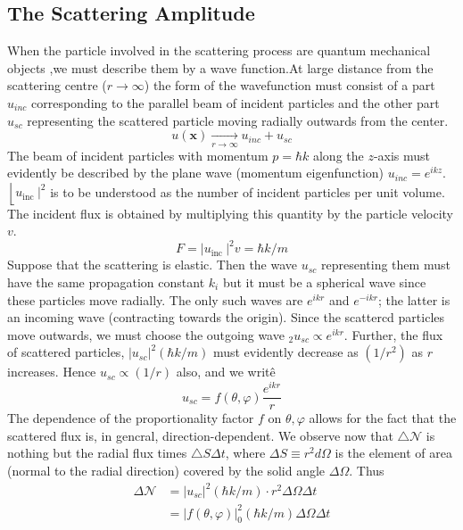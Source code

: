 \subsection{The Scattering Amplitude}
When the particle involved in the scattering process are quantum mechanical objects ,we must describe them by a wave function.At large distance from the scattering centre ($r\rightarrow \infty$) the form of the wavefunction must consist of a part $u_{inc}$ corresponding to the parallel beam of incident particles and the other part $u_{sc}$ representing the scattered particle moving radially outwards from the center.\\
$$u(\mathbf{x}) \underset{r \rightarrow \infty}{\longrightarrow} u_{i n c}+u_{s c}$$
The beam of incident particles with momentum $p=\hbar k$ along the $z$-axis must evidently be described by the plane wave (momentum eigenfunction) $u_{i n c}=e^{i k z}$.\\
 $\left\lfloor\left. u_{\text {inc }}\right|^{2}\right.$ is to be understood as the number of incident particles per unit volume. The incident flux is obtained by multiplying this quantity by the particle velocity $v$.
$$
F=\left|u_{\text {inc }}\right|^{2} v=\hbar k / m
$$ 
Suppose that the scattering is elastic. Then the wave $u_{s c}$ representing them must have the same propagation constant $k_{i}$ but it must be a spherical wave since these particles move radially. The only such waves are $e^{i k r}$ and $e^{-i k r}$; the latter is an incoming wave (contracting towards the origin). Since the scattercd particles move outwards, we must choose the outgoing wave $_{2} u_{s c} \propto e^{i k r}$. Further, the flux of scattered particles, $\left|u_{s c}\right|^{2}(\hbar k / m)$ must evidently decrease as $\left(1 / r^{2}\right)$ as $r$ increases. Hence $u_{s c} \propto(1 / r)$ also, and we writê
$$
u_{s c}=f(\theta, \varphi) \frac{e^{i k r}}{r}
$$
The dependence of the proportionality factor $f$ on $\theta, \varphi$ allows for the fact that the scattered flux is, in gencral, direction-dependent. We observe now that $\triangle \mathcal{N}$ is nothing but the radial flux times $\triangle S \Delta t$, where $\Delta S \equiv r^{2} d \Omega$ is the element of area (normal to the radial direction) covered by the solid angle $\Delta \Omega$. Thus
$$
\begin{aligned}
\Delta \mathcal{N} &=\left|u_{s c}\right|^{2}(\hbar k / m) \cdot r^{2} \Delta \Omega \Delta t \\
&=|f(\theta, \varphi)|_{0}^{2}(\hbar k / m) \Delta \Omega \Delta t
\end{aligned}
$$

